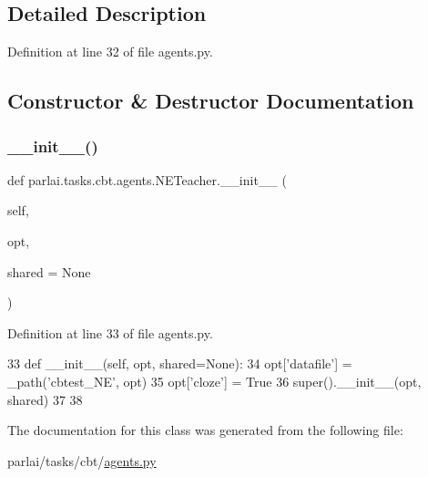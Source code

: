 \subsection{Detailed Description}


Definition at line 32 of file agents.\+py.



\subsection{Constructor \& Destructor Documentation}
\mbox{\label{classparlai_1_1tasks_1_1cbt_1_1agents_1_1NETeacher_aee59236dace0e90a86ce8ca23b8e05d2}} 
\subsubsection{\texorpdfstring{\+\_\+\+\_\+init\+\_\+\+\_\+()}{\_\_init\_\_()}}
{\footnotesize\ttfamily def parlai.\+tasks.\+cbt.\+agents.\+N\+E\+Teacher.\+\_\+\+\_\+init\+\_\+\+\_\+ (\begin{DoxyParamCaption}\item[{}]{self,  }\item[{}]{opt,  }\item[{}]{shared = {\ttfamily None} }\end{DoxyParamCaption})}



Definition at line 33 of file agents.\+py.


\begin{DoxyCode}
33     \textcolor{keyword}{def }\_\_init\_\_(self, opt, shared=None):
34         opt[\textcolor{stringliteral}{'datafile'}] = \_path(\textcolor{stringliteral}{'cbtest\_NE'}, opt)
35         opt[\textcolor{stringliteral}{'cloze'}] = \textcolor{keyword}{True}
36         super().\_\_init\_\_(opt, shared)
37 
38 
\end{DoxyCode}


The documentation for this class was generated from the following file\+:\begin{DoxyCompactItemize}
\item 
parlai/tasks/cbt/\hyperlink{parlai_2tasks_2cbt_2agents_8py}{agents.\+py}\end{DoxyCompactItemize}
